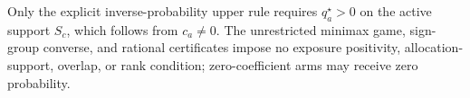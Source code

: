 Only the explicit inverse-probability upper rule requires \(q_a^\star>0\) on the active support \(S_c\), which follows from \(c_a\neq0\). The unrestricted minimax game, sign-group converse, and rational certificates impose no exposure positivity, allocation-support, overlap, or rank condition; zero-coefficient arms may receive zero probability.